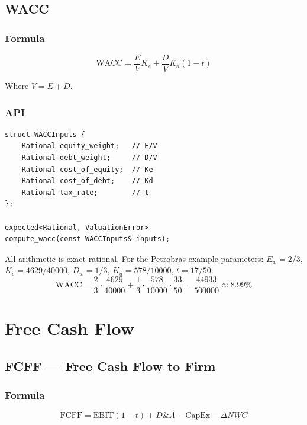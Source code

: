 \documentclass[12pt, a4paper, oneside]{book}
\newcommand{\EBIT}{\ensuremath{\mathrm{EBIT}}}
\newcommand{\FCFF}{\ensuremath{\mathrm{FCFF}}}
\newcommand{\WACC}{\ensuremath{\mathrm{WACC}}}
\newcommand{\Ke}{K_e}
\newcommand{\Kd}{K_d}
\begin{document}
\section{WACC}

\subsection{Formula}

\begin{equation}
  \WACC = \frac{E}{V} \Ke + \frac{D}{V} \Kd (1-t)
\end{equation}

Where $V = E + D$.

\subsection{API}

\begin{lstlisting}[style=cpp]
struct WACCInputs {
    Rational equity_weight;   // E/V
    Rational debt_weight;     // D/V
    Rational cost_of_equity;  // Ke
    Rational cost_of_debt;    // Kd
    Rational tax_rate;        // t
};

expected<Rational, ValuationError>
compute_wacc(const WACCInputs& inputs);
\end{lstlisting}

All arithmetic is exact rational. For the Petrobras example parameters:
$E_w = 2/3$, $\Ke = 4629/40000$, $D_w = 1/3$, $\Kd = 578/10000$, $t = 17/50$:
\[
  \WACC = \frac{2}{3} \cdot \frac{4629}{40000}
        + \frac{1}{3} \cdot \frac{578}{10000} \cdot \frac{33}{50}
        = \frac{44933}{500000} \approx 8.99\%
\]

\chapter{Free Cash Flow}

\section{FCFF --- Free Cash Flow to Firm}

\subsection{Formula}

\begin{equation}
  \FCFF = \EBIT(1-t) + D\&A - \text{CapEx} - \Delta NWC
  \label{eq:fcff}
\end{equation}
\end{document}
